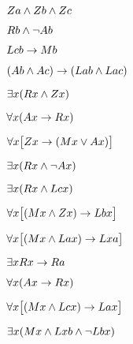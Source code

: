 \documentclass[PHIL101-Textbook.tex]{subfiles}
\begin{document}
\pagebreak	
	\begin{earg}
	\item %
	$Za \land Zb \land Zc$
	\item %
	$Rb \land \neg Ab$
	\item %
	$Lcb \rightarrow Mb$
	\item %
	$(Ab \land Ac)\rightarrow(Lab \land Lac)$
	\item %
	$\exists x(Rx \land Zx)$
	\item %
	$\forall x(Ax \rightarrow Rx)$
	\item %
	$\forall x\bigl[Zx \rightarrow (Mx \vee Ax)\bigr]$
	\item %
	$\exists x(Rx \land \neg Ax)$
	\item %
	$\exists x(Rx \land Lcx)$
	\item %
	$\forall x\bigl[(Mx \land Zx) \rightarrow Lbx\bigr]$
	\item %
	$\forall x\bigl[(Mx \land Lax) \rightarrow Lxa\bigr]$
	\item %
	$\exists x Rx \rightarrow Ra$
	\item %
	$\forall x(Ax \rightarrow Rx)$
	\item %
	$\forall x\bigl[(Mx \land Lcx) \rightarrow Lax\bigr]$
	\item %
	$\exists x(Mx \land Lxb \land \neg Lbx)$
	\end{earg}
%	
%	
\end{document}
